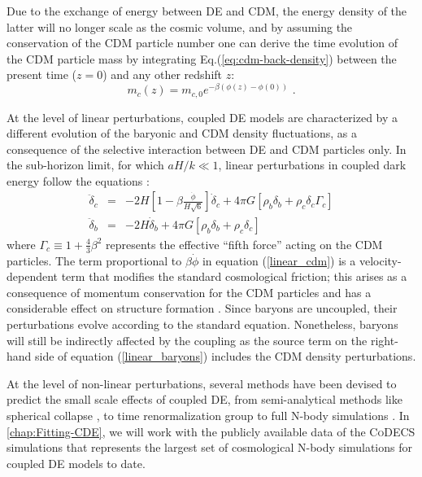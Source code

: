 Due to the exchange of energy between DE and CDM, the energy density
of the latter will no longer scale as the cosmic volume, and by assuming
the conservation of the CDM particle number one can derive the time
evolution of the CDM particle mass by integrating Eq.(\ref{eq:cdm-back-density})
between the present time ($z=0$) and any other redshift $z$:
\begin{equation}
m_{c}(z)=m_{c,0}e^{-\beta(\phi(z)-\phi(0))}\,\,.
\end{equation}


At the level of linear perturbations, coupled DE models are characterized
by a different evolution of the baryonic and CDM density fluctuations,
as a consequence of the selective interaction between DE and CDM particles
only. In the sub-horizon limit, for which $aH/k\ll1$, linear perturbations
in coupled dark energy follow the equations \citep{Amendola_2004,pettorino_baccigalupi_2008}:
\begin{eqnarray}
\ddot{\delta}_{c} & = & -2H\left[1-\beta\frac{\dot{\phi}}{H\sqrt{6}}\right]\dot{\delta}_{c}+4\pi G\left[\rho_{b}\delta_{b}+\rho_{c}\delta_{c}\Gamma_{c}\right]\label{linear_cdm}\\
\ddot{\delta}_{b} & = & -2H\dot{\delta}_{b}+4\pi G\left[\rho_{b}\delta_{b}+\rho_{c}\delta_{c}\right]\label{linear_baryons}
\end{eqnarray}
where $\Gamma_{c}\equiv1+\frac{4}{3}\beta^{2}$ represents the effective
``fifth force'' acting on the CDM particles. The term proportional
to $\beta\dot{\phi}$ in equation (\ref{linear_cdm}) is a velocity-dependent
term that modifies the standard cosmological friction; this arises
as a consequence of momentum conservation for the CDM particles and
has a considerable effect on structure formation \citep{baldi_etal_2010,baldi_clarifying_2011,Li_Barrow_2011}.
Since baryons are uncoupled, their perturbations evolve according
to the standard equation. Nonetheless, baryons will still be indirectly
affected by the coupling as the source term on the right-hand side
of equation (\ref{linear_baryons}) includes the CDM density perturbations.

At the level of non-linear perturbations, several methods have been
devised to predict the small scale effects of coupled DE, from semi-analytical
methods like spherical collapse \cite{Pace_Waizmann_Bartelmann_2010},
to time renormalization group \citep{Saracco_etal_2010} to full N-body
simulations \citep{Maccio_etal_2004,baldi_etal_2010,Li_Barrow_2011,Carlesi_etal_2014a}.
In \cref{chap:Fitting-CDE}, we will work with the publicly available data of
the \textsc{CoDECS} simulations \citep{baldi_codecs_2012}
that represents the largest set of cosmological N-body simulations
for coupled DE models to date.



